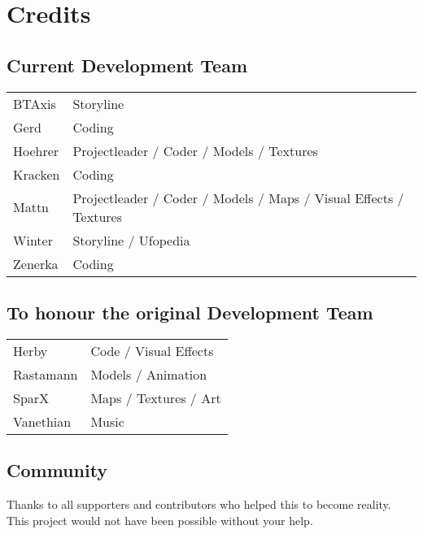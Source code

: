 \section{Credits}

\subsection{Current Development Team}
\begin{tabular}{l | l}
BTAxis & Storyline \\
Gerd & Coding \\
Hoehrer & Projectleader / Coder / Models / Textures \\
Kracken & Coding \\
Mattn & Projectleader / Coder / Models / Maps / Visual Effects / Textures \\
Winter & Storyline / Ufopedia \\
Zenerka & Coding
\end{tabular} 

\subsection{To honour the original Development Team}
\begin{tabular}{l | l}
Herby & Code / Visual Effects\\ 
Rastamann & Models / Animation\\ 
SparX & Maps / Textures / Art\\ 
Vanethian & Music\\ 
\end{tabular} 

\subsection{Community}
Thanks to all supporters and contributors who helped this to become reality. This project would not have been possible without your help.